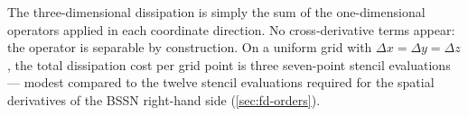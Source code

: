 The three-dimensional dissipation is simply the sum of the
one-dimensional operators applied in each coordinate direction.  No
cross-derivative terms appear: the operator is separable by construction.
On a uniform grid with $\Delta x = \Delta y = \Delta z$, the total
dissipation cost per grid point is three seven-point stencil
evaluations --- modest compared to the twelve stencil evaluations
required for the spatial derivatives of the BSSN right-hand side
(\cref{sec:fd-orders}).
